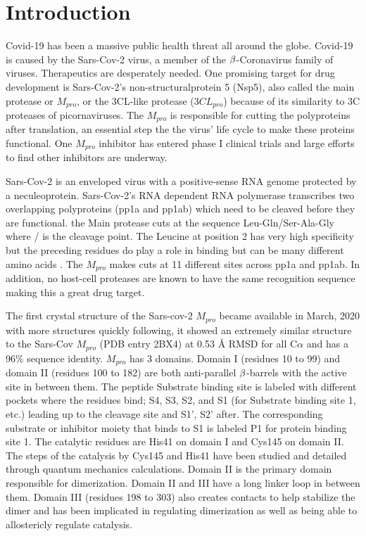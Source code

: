 \documentclass{biophys-new}
\begin{document}
\section*{Introduction}

Covid-19 has been a massive public health threat all around the globe. Covid-19 is caused by the Sars-Cov-2 virus, a member of the $\MakeUppercase{\beta}$-Coronavirus family of viruses. Therapeutics are desperately needed. One promising target for drug development is Sars-Cov-2's non-structuralprotein 5 (Nsp5), also called the main protease or $M_{pro}$, or the 3CL-like protease ($3CL_{pro}$) because of its similarity to 3C proteases of picornaviruses\cite{tan2005ph}. The $M_{pro}$ is responsible for cutting the polyproteins after translation, an essential step the the virus' life cycle to make these proteins functional. One $M_{pro}$ inhibitor has entered phase I clinical trials and large efforts to find other inhibitors are underway\cite{achdout2020covid}.

Sars-Cov-2 is an enveloped virus with a positive-sense RNA genome protected by a neculeoprotein. Sars-Cov-2's RNA dependent RNA polymerase transcribes two overlapping polyproteins (pp1a and pp1ab) which need to be cleaved before they are functional. the Main protease cuts at the sequence Leu-Gln/Ser-Ala-Gly  where / is the cleavage point\cite{Zhang409}. The Leucine at position 2 has very high specificity but the preceding residues do play a role in binding but can be many different amino acids \cite{rut2020substrate}. The $M_{pro}$ makes cuts at 11 different sites across pp1a and pp1ab. In addition, no host-cell proteases are known to have the same recognition sequence making this a great drug target\cite{hilgenfeld2014sars}. 

The first crystal structure of the Sars-cov-2 $M_{pro}$ became available in March, 2020 \cite{Zhang409} with more structures quickly following\cite{owen2020sars}\cite{jin2020structure}, it showed an extremely similar structure to the Sars-Cov $M_{pro}$ (PDB entry 2BX4)\cite{tan2005ph} at 0.53 Å RMSD for all C$\alpha$ and has a 96\% sequence identity\cite{Zhang409}. $M_{pro}$ has 3 domains. Domain I (residues 10 to 99) and domain II (residues 100 to 182) are both anti-parallel $\MakeUppercase{\beta}$-barrels with the active site in between them. The peptide Substrate binding site is labeled with different pockets where the residues bind; S4, S3, S2, and S1 (for Substrate binding site 1, etc.) leading up to the cleavage site and S1', S2' after. The corresponding substrate or inhibitor moiety that binds to S1 is labeled P1 for protein binding site 1. The catalytic residues are His41 on domain I and Cys145 on domain II. The steps of the catalysis by Cys145 and His41 have been studied and detailed through quantum mechanics calculations. \cite{swiderek2020revealing} Domain II is the primary domain responsible for dimerization. Domain II and III have a long linker loop in between them. Domain III (residues 198 to 303) also creates contacts to help stabilize the dimer and has been implicated in regulating dimerization as well as being able to allostericly regulate catalysis.
\end{document}
